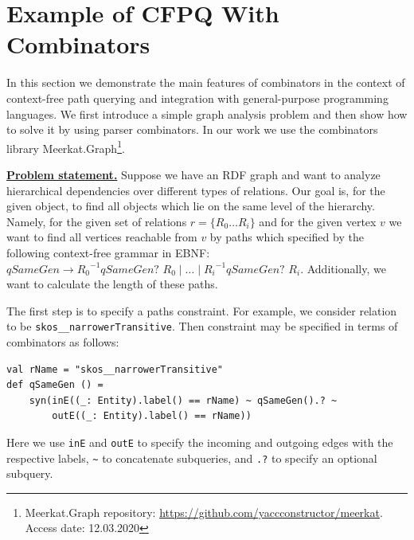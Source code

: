 \section{Example of CFPQ With Combinators}\label{sect:combinators}

In this section we demonstrate the main features of combinators in the context of context-free path querying and integration with general-purpose programming languages.
We first introduce a simple graph analysis problem and then show how to solve it by using parser combinators.
In our work we use the combinators library Meerkat.Graph\footnote{Meerkat.Graph repository: \url{https://github.com/yaccconstructor/meerkat}. Access date: 12.03.2020}.

\underline{\textbf{Problem statement.}}
Suppose we have an RDF graph and want to analyze hierarchical dependencies over different types of relations.
Our goal is, for the given object, to find all objects which lie on the same level of the hierarchy.
Namely, for the given set of relations $r = \{R_0 \ldots R_i\}$ and for the given vertex $v$ we want to find all vertices reachable from $v$ by paths which specified by the following context-free grammar in EBNF:
 $\textit{qSameGen} \to {R_0}^{-1} \textit{qSameGen? } R_0 \mid \ldots \mid {R_i}^{-1} \textit{qSameGen? } R_i.$
Additionally, we want to calculate the length of these paths.


The first step is to specify a paths constraint.
For example, we consider relation to be \verb|skos__narrowerTransitive|.
Then constraint may be specified in terms of combinators as follows:

\begin{lstlisting}
val rName = "skos__narrowerTransitive"
def qSameGen () =
    syn(inE((_: Entity).label() == rName) ~ qSameGen().? ~
        outE((_: Entity).label() == rName))
\end{lstlisting}

Here we use \verb|inE| and \verb|outE| to specify the incoming and outgoing edges with the respective labels, \verb|~| to concatenate subqueries, and \verb|.?| to specify an optional subquery.

